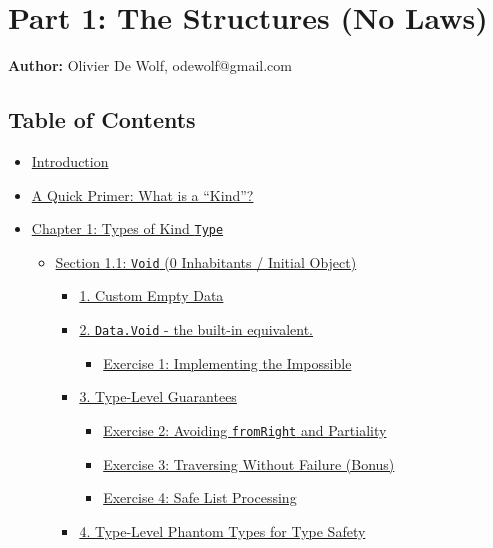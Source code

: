 \documentclass[
]{article}
\author{}
\date{}
\providecommand{\tightlist}{%
  \setlength{\itemsep}{0pt}\setlength{\parskip}{0pt}}
\begin{document}
{
\setcounter{tocdepth}{3}
\tableofcontents
}
\section{Part 1: The Structures (No
Laws)}\label{part-1-the-structures-no-laws}

\textbf{Author:} Olivier De Wolf, odewolf@gmail.com

\subsection{Table of Contents}\label{table-of-contents}

\begin{itemize}
\tightlist
\item
  \hyperref[introduction]{Introduction}
\item
  \hyperref[a-quick-primer-what-is-a-kind]{A Quick Primer: What is a
  ``Kind''?}
\item
  \hyperref[chapter-1-types-of-kind-type]{Chapter 1: Types of Kind
  \texttt{Type}}

  \begin{itemize}
  \tightlist
  \item
    \hyperref[section-11-void-0-inhabitants--initial-object]{Section
    1.1: \texttt{Void} (0 Inhabitants / Initial Object)}

    \begin{itemize}
    \tightlist
    \item
      \hyperref[1-custom-empty-data]{1. Custom Empty Data}
    \item
      \hyperref[2-datavoid---the-built-in-equivalent]{2.
      \texttt{Data.Void} - the built-in equivalent.}

      \begin{itemize}
      \tightlist
      \item
        \hyperref[exercise-1-implementing-the-impossible]{Exercise 1:
        Implementing the Impossible}
      \end{itemize}
    \item
      \hyperref[3-type-level-guarantees]{3. Type-Level Guarantees}

      \begin{itemize}
      \tightlist
      \item
        \hyperref[exercise-2-avoiding-fromright-and-partiality]{Exercise
        2: Avoiding \texttt{fromRight} and Partiality}
      \item
        \hyperref[exercise-3-traversing-without-failure-bonus]{Exercise
        3: Traversing Without Failure (Bonus)}
      \item
        \hyperref[exercise-4-safe-list-processing]{Exercise 4: Safe List
        Processing}
      \end{itemize}
    \item
      \hyperref[4-type-level-phantom-types-for-type-safety]{4.
      Type-Level Phantom Types for Type Safety}


\end{itemize}
\end{itemize}
\end{itemize}
\end{document}
